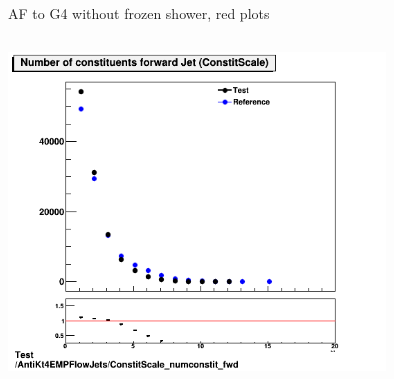 \begin{frame}{AF to G4 without frozen shower, red plots}
\begin{columns}
\begin{column}{0.5\textwidth}
            \includegraphics[width=0.75\textwidth]{3r_cumconstit_constit}
        \end{column}
    \end{columns}
\end{frame}

